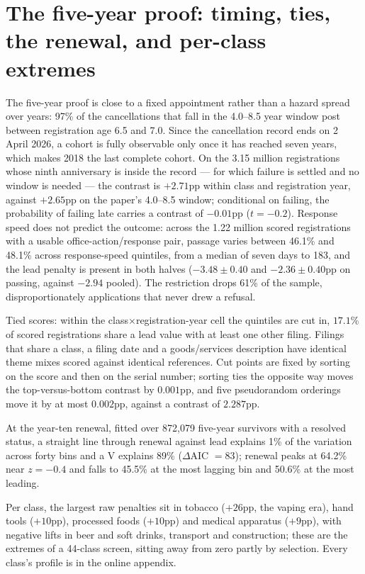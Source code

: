 \section{The five-year proof: timing, ties, the renewal, and per-class extremes}\label{supp:proof}

The five-year proof is close to a fixed appointment rather than a hazard
spread over years: 97\% of the cancellations that fall in the 4.0--8.5
year window post between registration age 6.5 and 7.0. Since the
cancellation record ends on 2 April 2026, a cohort is fully observable
only once it has reached seven years, which makes 2018 the last complete
cohort. On the 3.15 million registrations whose ninth anniversary is
inside the record --- for which failure is settled and no window is
needed --- the contrast is $+2.71$pp within class and registration year,
against $+2.65$pp on the paper's 4.0--8.5 window; conditional on
failing, the probability of failing late carries a contrast of
$-0.01$pp ($t = -0.2$). Response speed does not predict the outcome:
across the 1.22 million scored registrations with a usable
office-action/response pair, passage varies between 46.1\% and 48.1\%
across response-speed quintiles, from a median of seven days to 183, and
the lead penalty is present in both halves ($-3.48 \pm 0.40$ and
$-2.36 \pm 0.40$pp on passing, against $-2.94$ pooled). The restriction
drops 61\% of the sample, disproportionately applications that never
drew a refusal.

Tied scores: within the class$\times$registration-year cell the quintiles
are cut in, $17.1$\% of scored registrations share a lead value with at
least one other filing. Filings that share a class, a filing date and a
goods/services description have identical theme mixes scored against
identical references. Cut points are fixed by sorting on the score and
then on the serial number; sorting ties the opposite way moves the
top-versus-bottom contrast by $0.001$pp, and five pseudorandom orderings
move it by at most $0.002$pp, against a contrast of $2.287$pp.

At the year-ten renewal, fitted over 872{,}079 five-year survivors with a
resolved status, a straight line through renewal against lead explains
1\% of the variation across forty bins and a V explains 89\%
($\Delta$AIC $= 83$); renewal peaks at 64.2\% near $z = -0.4$ and falls
to 45.5\% at the most lagging bin and 50.6\% at the most leading.

Per class, the largest raw penalties sit in tobacco ($+26$pp, the vaping
era), hand tools ($+10$pp), processed foods ($+10$pp) and medical
apparatus ($+9$pp), with negative lifts in beer and soft drinks,
transport and construction; these are the extremes of a 44-class screen,
sitting away from zero partly by selection. Every class's profile is in
the online appendix.

